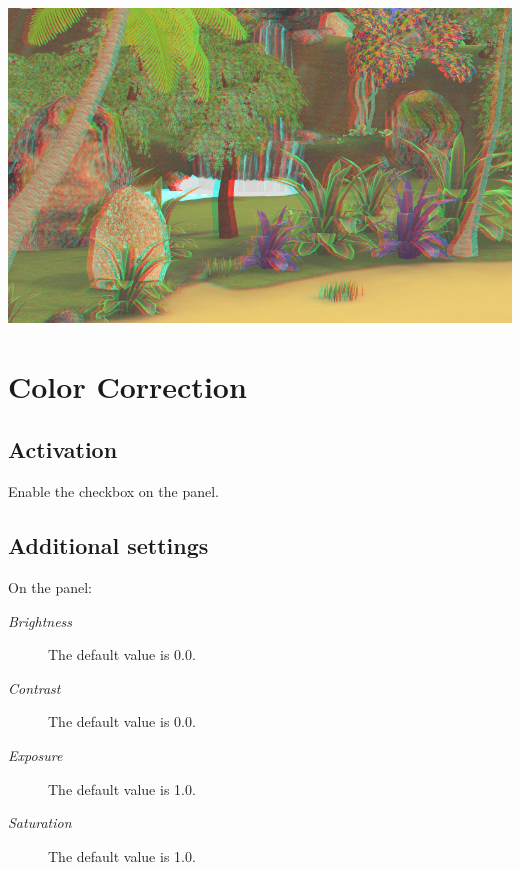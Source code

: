 \documentclass[a4paper,12pt,oneside]{sphinxmanual}
\begin{document}
{\hfill\includegraphics[width=1.000\linewidth]{anaglyph.jpg}\hfill}

\begin{DUlineblock}{0em}
\item[] 
\end{DUlineblock}


\section{Color Correction}
\label{postprocessing_effects:index-6}\label{postprocessing_effects:id23}\label{postprocessing_effects:color-correction}

\subsection{Activation}
\label{postprocessing_effects:id24}
Enable the  checkbox on the  panel.


\subsection{Additional settings}
\label{postprocessing_effects:id25}
On the  panel:
\begin{description}
\item[{\emph{Brightness}}] \leavevmode
The default value is 0.0.

\item[{\emph{Contrast}}] \leavevmode
The default value is 0.0.

\item[{\emph{Exposure}}] \leavevmode
The default value is 1.0.

\item[{\emph{Saturation}}] \leavevmode
The default value is 1.0.

\end{description}
\end{document}
